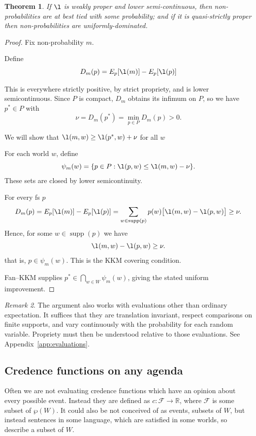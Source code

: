 \documentclass[11pt]{article}
\newtheorem{theorem}{Theorem}[section]
\theoremstyle{definition}
\theoremstyle{remark}
\newtheorem{remark}[theorem]{Remark}
\newcommand{\R}{\mathbb R}
\newcommand{\agenda}{\mathcal F}
\newcommand{\supp}{\operatorname{supp}}
\begin{document}
\begin{theorem}
	If $\l$ is weakly proper and lower semi-continuous, then non-probabilities are at best tied with some probability; and if it is quasi-strictly proper then non-probabilities are uniformly-dominated. 
\end{theorem}
\begin{proof}
	Fix non-probability $m$. 
	
	Define \[D_m(p)=E_p[\l(m)]-E_p[\l(p)]\]
	
	This is everywhere strictly positive, by strict propriety, and is lower semicontinuous.
	Since $P$ is compact, $D_m$ obtains its infimum on $P$, so we have $p^*\in P$ with 
	\[
	\nu=D_m(p^*)=\min_{p\in P}D_m(p)>0.
	\]
	
	
	We will show that $\l(m,w)\geq  \l(p^*,w)+\nu$ for all $w$
	
	
	For each world $w$, define
	\[
	\psi_m(w)=
	\{p\in P:\l(p,w)\le \l(m,w)-\nu\}.
	\]
	These sets are closed by lower semicontinuity.
	
	For every fs $p$
	\[D_m(p)=E_p[\l(m)]-E_p[\l(p)]=
	\sum_{w\in\supp(p)}
	p(w)\bigl[\l(m,w)-\l(p,w)\bigr]\ge\nu.
	\]
	Hence, for some $w\in\supp(p)$ we have \[\l(m,w)-\l(p,w)\ge\nu.
	\] that is, $p\in \psi_m(w)$. 
	This is the KKM covering condition.
	
	Fan--KKM supplies
	$p^*\in\bigcap_{w\in W}\psi_m(w)$,
	giving the stated uniform improvement.
	
\end{proof}
	\begin{remark}
	The argument also works with evaluations other
	than ordinary expectation. It suffices that they
	are translation invariant, respect comparisons
	on finite supports, and vary continuously with
	the probability for each random variable. 
	Propriety must then be understood relative to
	those evaluations. See Appendix~\ref{app:evaluations}.
\end{remark}




\subsection{Credence functions on any agenda}

Often we are not evaluating credence functions which have an opinion about every possible event. Instead they are defined as $c:\agenda\to\R$, where $\agenda$ is some subset of $\wp(W)$. It could also be not conceived of as events, subsets of $W$, but instead sentences in some language, which are satisfied in some worlds, so describe a subset of $W$.
\end{document}
